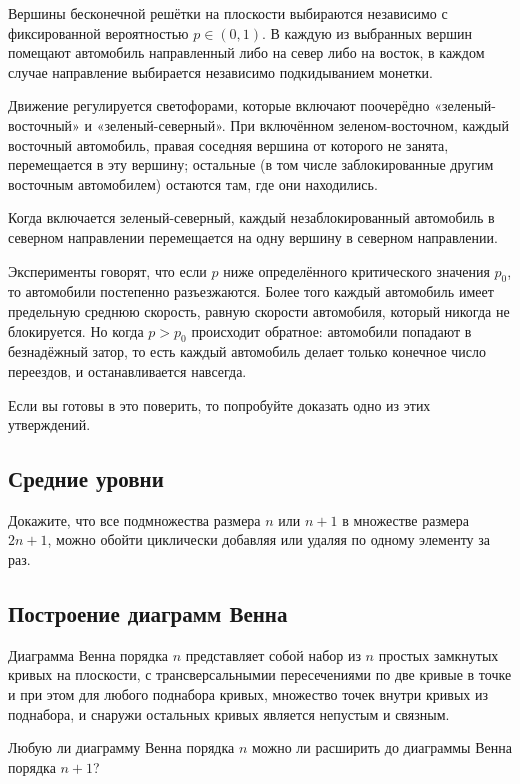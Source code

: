 Вершины бесконечной решётки на плоскости выбираются независимо с фиксированной вероятностью $p\in (0,1)$.
В каждую из выбранных вершин помещают автомобиль направленный либо на север либо на восток,
в каждом  случае направление выбирается независимо подкидыванием монетки.

Движение регулируется светофорами, которые включают поочерёдно «зеленый-восточный» и «зеленый-северный».
При включённом зеленом-восточном, каждый восточный автомобиль, правая соседняя вершина от которого не занята, перемещается в эту вершину; остальные (в том числе заблокированные другим восточным автомобилем) остаются там, где они находились.

Когда включается зеленый-северный, каждый незаблокированный автомобиль в северном направлении перемещается на одну вершину в северном направлении.

Эксперименты говорят, что если $p$ ниже определённого критического значения $p_0$,
то автомобили постепенно разъезжаются.
Более того каждый автомобиль имеет предельную среднюю скорость, равную скорости автомобиля, который никогда не блокируется.
Но когда $p> p_0$ происходит обратное: автомобили попадают в безнадёжный затор, то есть каждый автомобиль делает только конечное число переездов, и останавливается навсегда.

Если вы готовы в это поверить, то попробуйте доказать одно из этих утверждений.

\subsection*{Средние уровни}

Докажите, что все подмножества размера $n$ или $n+1$ в множестве размера $2n+1$, можно обойти циклически добавляя или удаляя по одному элементу за раз.

\subsection*{Построение диаграмм Венна}

Диаграмма Венна порядка $n$ представляет собой набор из $n$ простых замкнутых кривых на плоскости, с трансверсальнымии пересечениями  по две кривые в точке и при этом для любого поднабора кривых, множество точек внутри кривых из поднабора, и снаружи остальных кривых является непустым и связным.

Любую ли диаграмму Венна порядка $n$ можно ли расширить до диаграммы Венна порядка $n+1$?

